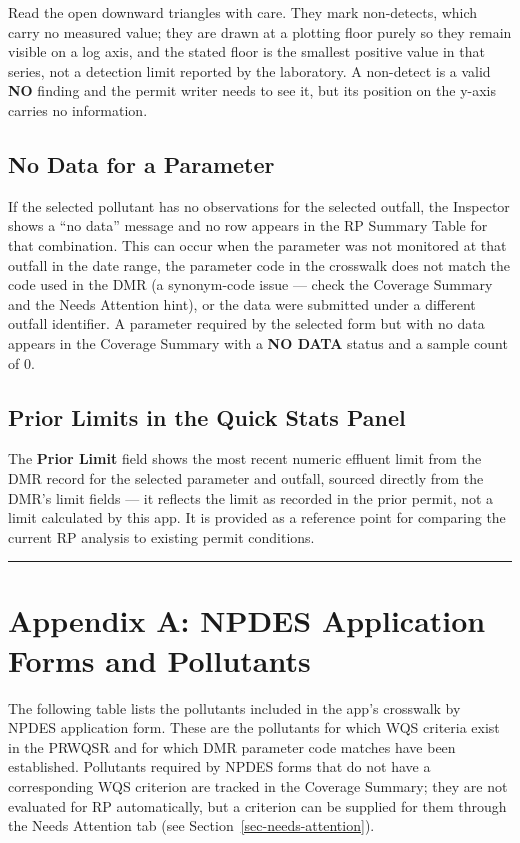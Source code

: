 \documentclass[
  11pt,
  letterpaper,
  DIV=11,
  numbers=noendperiod]{scrartcl}
\begin{document}
Read the open downward triangles with care. They mark non-detects, which
carry no measured value; they are drawn at a plotting floor purely so
they remain visible on a log axis, and the stated floor is the smallest
positive value in that series, not a detection limit reported by the
laboratory. A non-detect is a valid \textbf{NO} finding and the permit
writer needs to see it, but its position on the y-axis carries no
information.

\subsection{No Data for a Parameter}\label{sec-interpret-nodata}

If the selected pollutant has no observations for the selected outfall,
the Inspector shows a ``no data'' message and no row appears in the RP
Summary Table for that combination. This can occur when the parameter
was not monitored at that outfall in the date range, the parameter code
in the crosswalk does not match the code used in the DMR (a synonym-code
issue --- check the Coverage Summary and the Needs Attention hint), or
the data were submitted under a different outfall identifier. A
parameter required by the selected form but with no data appears in the
Coverage Summary with a \textbf{NO DATA} status and a sample count of 0.

\subsection{Prior Limits in the Quick Stats
Panel}\label{sec-prior-limits}

The \textbf{Prior Limit} field shows the most recent numeric effluent
limit from the DMR record for the selected parameter and outfall,
sourced directly from the DMR's limit fields --- it reflects the limit
as recorded in the prior permit, not a limit calculated by this app. It
is provided as a reference point for comparing the current RP analysis
to existing permit conditions.

\begin{center}\rule{0.5\linewidth}{0.5pt}\end{center}

\section{Appendix A: NPDES Application Forms and
Pollutants}\label{sec-appendix-npdes}

The following table lists the pollutants included in the app's crosswalk
by NPDES application form. These are the pollutants for which WQS
criteria exist in the PRWQSR and for which DMR parameter code matches
have been established. Pollutants required by NPDES forms that do not
have a corresponding WQS criterion are tracked in the Coverage Summary;
they are not evaluated for RP automatically, but a criterion can be
supplied for them through the Needs Attention tab (see
Section~\ref{sec-needs-attention}).
\end{document}
